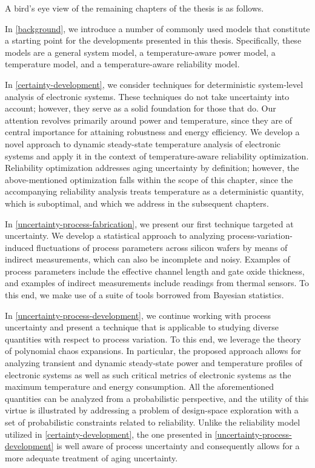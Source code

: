 A bird's eye view of the remaining chapters of the thesis is as follows.

In \cref{background}, we introduce a number of commonly used models that
constitute a starting point for the developments presented in this thesis.
Specifically, these models are a general system model, a temperature-aware power
model, a temperature model, and a temperature-aware reliability model.

In \cref{certainty-development}, we consider techniques for deterministic
system-level analysis of electronic systems. These techniques do not take
uncertainty into account; however, they serve as a solid foundation for those
that do. Our attention revolves primarily around power and temperature, since
they are of central importance for attaining robustness and energy efficiency.
We develop a novel approach to dynamic steady-state temperature analysis of
electronic systems and apply it in the context of temperature-aware reliability
optimization. Reliability optimization addresses aging uncertainty by
definition; however, the above-mentioned optimization falls within the scope of
this chapter, since the accompanying reliability analysis treats temperature as
a deterministic quantity, which is suboptimal, and which we address in the
subsequent chapters.

In \cref{uncertainty-process-fabrication}, we present our first technique
targeted at uncertainty. We develop a statistical approach to analyzing
process-variation-induced fluctuations of process parameters across silicon
wafers by means of indirect measurements, which can also be incomplete and
noisy. Examples of process parameters include the effective channel length and
gate oxide thickness, and examples of indirect measurements include readings
from thermal sensors. To this end, we make use of a suite of tools borrowed from
Bayesian statistics.

In \cref{uncertainty-process-development}, we continue working with process
uncertainty and present a technique that is applicable to studying diverse
quantities with respect to process variation. To this end, we leverage the
theory of polynomial chaos expansions. In particular, the proposed approach
allows for analyzing transient and dynamic steady-state power and temperature
profiles of electronic systems as well as such critical metrics of electronic
systems as the maximum temperature and energy consumption. All the
aforementioned quantities can be analyzed from a probabilistic perspective, and
the utility of this virtue is illustrated by addressing a problem of
design-space exploration with a set of probabilistic constraints related to
reliability. Unlike the reliability model utilized in
\cref{certainty-development}, the one presented in
\cref{uncertainty-process-development} is well aware of process uncertainty and
consequently allows for a more adequate treatment of aging uncertainty.

